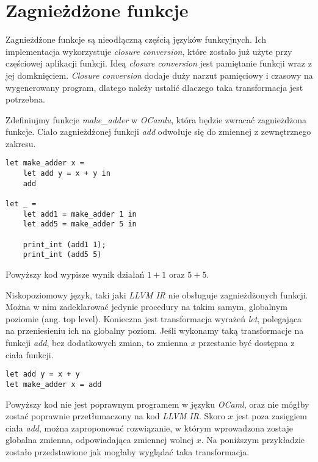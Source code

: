 \documentclass[declaration,shortabstract]{iithesis}
\begin{document}


\section{Zagnieżdżone funkcje}

Zagnieżdżone funkcje są nieodłączną częścią języków funkcyjnych. Ich implementacja wykorzystuje 
\textit{closure conversion}, które zostało już użyte przy częściowej aplikacji funkcji. 
Ideą \textit{closure conversion} jest pamiętanie funkcji wraz z jej domknięciem. 
\textit{Closure conversion} dodaje duży narzut pamięciowy i czasowy na wygenerowany program,
dlatego należy ustalić dlaczego taka transformacja jest potrzebna.

Zdefiniujmy funkcje \textit{make\_adder} w \textit{OCamlu}, która będzie zwracać zagnieżdżona funkcje.
Ciało zagnieżdżonej funkcji \textit{add} odwołuje się do zmiennej z zewnętrznego zakresu.

\begin{lstlisting}[frame=single, caption={Zagnieżdżona funkcja w \textit{OCamlu}}]
let make_adder x = 
    let add y = x + y in 
    add 
  
let _ = 
    let add1 = make_adder 1 in 
    let add5 = make_adder 5 in 
    
    print_int (add1 1);
    print_int (add5 5) 
\end{lstlisting}
Powyższy kod wypisze wynik działań $1 + 1$ oraz $5 + 5$. 

Niskopoziomowy język, taki jaki \textit{LLVM IR} nie obsługuje zagnieżdżonych 
funkcji. Można w
nim zadeklarować jedynie procedury na takim samym, globalnym poziomie (ang. 
top level). 
Konieczna jest transformacja wyrażeń \textit{let}, polegająca na przeniesieniu 
ich na globalny poziom. 
Jeśli wykonamy taką transformacje na funkcji \textit{add}, bez dodatkowych 
zmian, to zmienna $x$
przestanie być dostępna z ciała funkcji.

\begin{lstlisting}[frame=single, caption={Po przeniesieniu funkcji \textit{add} na globalny poziom}]
let add y = x + y 
let make_adder x = add 
\end{lstlisting}

Powyższy kod nie jest poprawnym programem w języku \textit{OCaml}, oraz 
nie mógłby zostać poprawnie przetłumaczony na kod \textit{LLVM IR}. 
Skoro $x$ jest poza zasięgiem ciała \textit{add}, można zaproponować rozwiązanie,
w którym wprowadzona zostaje globalna zmienna, odpowiadająca zmiennej wolnej $x$. 
Na poniższym przykładzie zostało przedstawione jak mogłaby wyglądać taka transformacja.
\end{document}
